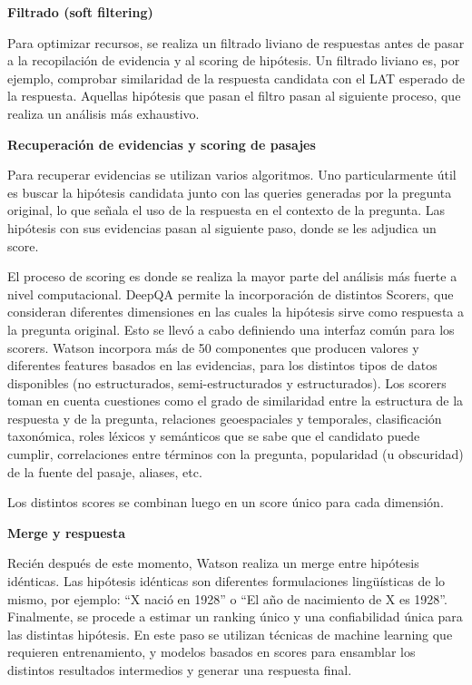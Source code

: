 \textbf{Filtrado (soft filtering)}\newline


Para optimizar recursos, se realiza un filtrado liviano de respuestas
antes de pasar a la recopilación de evidencia y al scoring de
hipótesis. Un filtrado liviano es, por ejemplo, comprobar similaridad
de la respuesta candidata con el LAT esperado de la respuesta. Aquellas
hipótesis que pasan el filtro pasan al siguiente proceso, que realiza
un análisis más exhaustivo. \newline 

\textbf{Recuperación de evidencias y scoring de pasajes}\newline

Para recuperar evidencias se utilizan varios algoritmos. Uno
particularmente útil es buscar la hipótesis candidata junto con las
queries generadas por la pregunta original, lo que señala el uso de
la respuesta en el contexto de la pregunta.  Las hipótesis con sus
evidencias pasan al siguiente paso, donde se les adjudica un score. 

El proceso de scoring es donde se realiza la mayor parte del análisis
más fuerte a nivel computacional. DeepQA permite la incorporación
de distintos Scorers, que consideran diferentes dimensiones en las
cuales la hipótesis sirve como respuesta a la pregunta original. Esto
se llevó a cabo definiendo una interfaz común para los scorers.
Watson incorpora más de 50 componentes que producen valores y
diferentes features basados en las evidencias, para los distintos tipos
de datos disponibles (no estructurados, semi-estructurados y
estructurados). Los scorers toman en cuenta cuestiones como el grado de
similaridad entre la estructura de la respuesta y de la pregunta,
relaciones geoespaciales y temporales, clasificación taxonómica,
roles léxicos y semánticos que se sabe que el candidato puede
cumplir, correlaciones entre términos con la pregunta, popularidad (u
obscuridad) de la fuente del pasaje, aliases, etc.

Los distintos scores se combinan luego en un score único para cada
dimensión. \newline 

\textbf{Merge y respuesta}\newline

Recién después de este momento, Watson realiza un merge entre
hipótesis idénticas. Las hipótesis idénticas son diferentes
formulaciones lingüísticas de lo mismo, por ejemplo:
{\textquotedblleft}X nació en 1928{\textquotedblright} o
{\textquotedblleft}El año de nacimiento de X es
1928{\textquotedblright}. Finalmente, se procede a estimar un ranking
único y una confiabilidad única para las distintas hipótesis. En
este paso se utilizan técnicas de machine learning que requieren
entrenamiento, y modelos basados en scores para ensamblar los distintos
resultados intermedios y generar una respuesta final.
